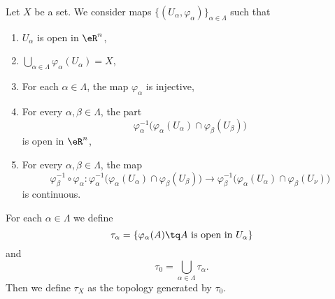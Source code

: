 \begin{theorem}		\label{THOooFIHIooLiSUxH}
	Let \( X\) be a set. We consider maps \( \{ (U_\alpha,\varphi_{\alpha}) \}_{\alpha\in\Lambda}\) such that
	\begin{enumerate}
		\item		\label{ITEMooDWSWooWdcDdI}
		      \( U_{\alpha}\) is open in \( \eR^n\),
		\item		\label{ITEMùooPEXDooNuJBKH}
		      \( \bigcup_{\alpha\in\Lambda}\varphi_{\alpha}(U_{\alpha})=X\),
		\item		\label{ITEMooSRPQooNUPzlj}
		      For each \( \alpha\in \Lambda\), the map \( \varphi_{\alpha}\) is injective,
		\item		\label{ITEMooWFAWooAqQfzZ}
		      For every \( \alpha,\beta\in\Lambda\), the part
		      \begin{equation}
			      \varphi_{\alpha}^{-1}\big( \varphi_{\alpha}(U_{\alpha})\cap \varphi_{\beta}(U_{\beta}) \big)
		      \end{equation}
		      is open in \( \eR^n\),
		\item	\label{ITEMooZHLXooBpWSXr}
		      For every \( \alpha,\beta\in\Lambda\), the map
		      \begin{equation}
			      \varphi_{\beta}^{-1}\circ\varphi_{\alpha} \colon \varphi_{\alpha}^{-1}\big( \varphi_{\alpha}(U_{\alpha})\cap\varphi_{\beta}(U_{\beta}) \big)\to \varphi_{\beta}^{-1}\big( \varphi_{\alpha}(U_{\alpha})\cap\varphi_{\beta}(U_{\nu}) \big)
		      \end{equation}
		      is continuous.
	\end{enumerate}

	For each \( \alpha\in\Lambda\) we define
	\begin{equation}
		\tau_{\alpha}=\{ \varphi_{\alpha}(A)\tq \text{\( A\) is open in \( U_{\alpha}\)} \}
	\end{equation}
	and
	\begin{equation}
		\tau_{0}=\bigcup_{\alpha\in\Lambda}\tau_{\alpha}.
	\end{equation}
	Then we define \( \tau_X\) as the topology generated by \( \tau_0\).


\end{theorem}
